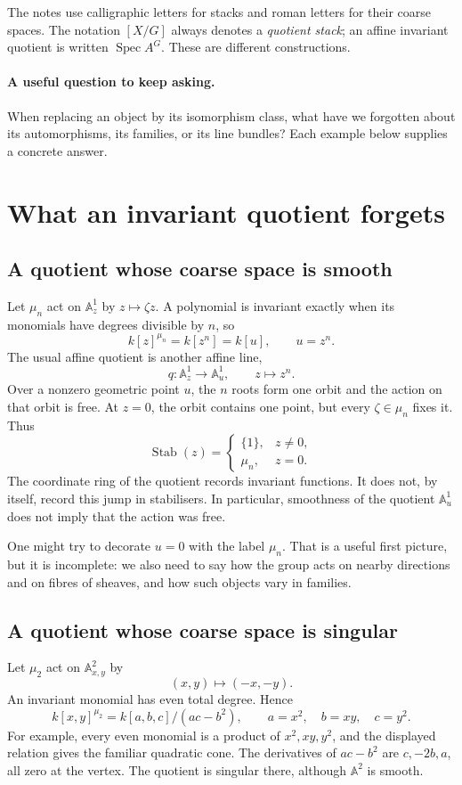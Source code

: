 \documentclass[11pt,a4paper]{article}
\numberwithin{equation}{section}
\theoremstyle{definition}
\newcommand{\A}{\mathbb A}
\newcommand{\Spec}{\operatorname{Spec}}
\newcommand{\Stab}{\operatorname{Stab}}
\begin{document}
The notes use calligraphic letters for stacks and roman letters for their coarse
spaces. The notation $[X/G]$ always denotes a \emph{quotient stack}; an affine
invariant quotient is written $\Spec A^G$. These are different constructions.

\paragraph{A useful question to keep asking.}
When replacing an object by its isomorphism class, what have we forgotten about
its automorphisms, its families, or its line bundles? Each example below supplies
a concrete answer.

\section{What an invariant quotient forgets}
\label{sec:quotients}

\subsection{A quotient whose coarse space is smooth}
Let $\mu_n$ act on $\A^1_z$ by $z\mapsto\zeta z$. A polynomial is invariant
exactly when its monomials have degrees divisible by $n$, so
\[
 k[z]^{\mu_n}=k[z^n]=k[u],\qquad u=z^n.
\]
The usual affine quotient is another affine line,
\[
 q:\A^1_z\longrightarrow\A^1_u,\qquad z\longmapsto z^n.
\]
Over a nonzero geometric point $u$, the $n$ roots form one orbit and the action
on that orbit is free. At $z=0$, the orbit contains one point, but every
$\zeta\in\mu_n$ fixes it. Thus
\[
 \Stab(z)=\begin{cases}\{1\},&z\ne0,\\ \mu_n,&z=0.\end{cases}
\]
The coordinate ring of the quotient records invariant functions. It does not,
by itself, record this jump in stabilisers. In particular, smoothness of the
quotient $\A^1_u$ does not imply that the action was free.

One might try to decorate $u=0$ with the label $\mu_n$. That is a useful first
picture, but it is incomplete: we also need to say how the group acts on nearby
directions and on fibres of sheaves, and how such objects vary in families.

\subsection{A quotient whose coarse space is singular}
Let $\mu_2$ act on $\A^2_{x,y}$ by
\[
 (x,y)\longmapsto(-x,-y).
\]
An invariant monomial has even total degree. Hence
\[
 k[x,y]^{\mu_2}=k[a,b,c]/(ac-b^2),\qquad
 a=x^2,\quad b=xy,\quad c=y^2.
\]
For example, every even monomial is a product of $x^2,xy,y^2$, and the displayed
relation gives the familiar quadratic cone. The derivatives of $ac-b^2$ are
$c,-2b,a$, all zero at the vertex. The quotient is singular there, although
$\A^2$ is smooth.
\end{document}
